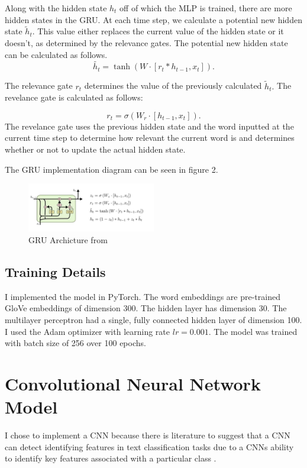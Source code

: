 \documentclass{article}
\begin{document}
Along with the hidden state $h_t$ off of which the MLP is trained, there are more hidden states in the GRU.
At each time step, we calculate a potential new hidden state $\tilde h_t.$ This value either replaces the current value of the hidden state or it doesn't, as determined by the relevance gates. The potential new hidden state can be calculated as follows. 
\begin{equation}\tilde{h_t} = \tanh(W \cdot [r_t * h_{t-1},x_t]).\end{equation}

The relevance gate $r_t$ determines the value of the previously calculated $\tilde h_t.$ The revelance gate is calculated as follows:

\begin{equation}r_t = \sigma(W_r \cdot[h_{t-1},x_t]).\end{equation}
The revelance gate uses the previous hidden state and the word inputted at the current time step to determine how relevant the current word is and determines whether or not to update the actual hidden state.

The GRU implementation diagram can be seen in figure 2.

\begin{figure}[h]
\caption{GRU Archicture from \cite{GRU}}
\centering
\includegraphics[width=0.5\textwidth]{GRU.png}
\end{figure}

\subsection{Training Details}
I implemented the model in PyTorch. The word embeddings are pre-trained GloVe embeddings of dimension 300. The hidden layer has dimension 30. The multilayer perceptron had a single, fully connected hidden layer of dimension 100. I used the Adam optimizer with learning rate $lr=0.001$. The model was trained with batch size of 256 over 100 epochs.


\section{Convolutional Neural Network Model}
I chose to implement a CNN because there is literature to suggest that a CNN can detect identifying features in text classification tasks due to a CNNs ability to identify key features associated with a particular class \cite{nnprimer}. 
\end{document}
